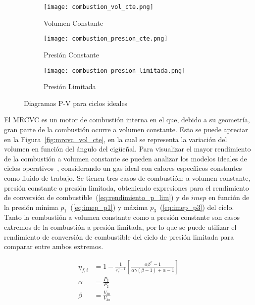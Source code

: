 \begin{figure}[ht]
  \centering
  \begin{subfigure}{0.3\textwidth}
    \centering
    \texttt{[image: combustion\_vol\_cte.png]}
    \caption{Volumen Constante}\label{fig:comb_vcte}
  \end{subfigure}%
  \begin{subfigure}{0.3\textwidth}
    \centering
    \texttt{[image: combustion\_presion\_cte.png]}
    \caption{Presión Constante}\label{fig:comb_pcte}
  \end{subfigure}%
  \begin{subfigure}{0.3\textwidth}
    \centering
    \texttt{[image: combustion\_presion\_limitada.png]}
    \caption{Presión Limitada}\label{fig:comb_plim}
  \end{subfigure}
  \caption{Diagramas P-V para ciclos ideales\parencite{heywood}}\label{fig:ciclos_ideales}
\end{figure}

El MRCVC es un motor de combustión interna en el que, debido a su geometría,
gran parte de la combustión ocurre a volumen constante.
%
Esto se puede apreciar en la Figura~\ref{fig:mrcvc_vol_cte}, en la cual se
representa la variación del volumen en función del ángulo del cigüeñal.
%
Para visualizar el mayor rendimiento de la combustión a volumen constante  se
pueden analizar los modelos ideales de ciclos operativos~\parencite{heywood},
considerando un gas ideal con calores específicos constantes como fluido de
trabajo.
%
Se tienen tres casos de combustión: a volumen constante, presión constante o presión
limitada, obteniendo expresiones para el rendimiento de conversión de
combustible~(\ref{eq:rendimiento_p_lim}) y de $imep$ en función de la presión
mínima $p_1$~(\ref{eq:imep_p1}) y máxima $p_3$~(\ref{eq:imep_p3}) del ciclo.
%
Tanto la combustión a volumen constante como a presión constante son casos
extremos de la combustión a presión limitada, por lo que se puede utilizar el
rendimiento de conversión de combustible del ciclo de presión limitada para
comparar entre ambos extremos.


\begin{align}
    \label{eq:rendimiento_p_lim}
  \eta_{f,i} &= 1 - \frac{1}{r_c^{\gamma - 1}} \left[ \frac{\alpha \beta^\gamma-1}{\alpha \gamma (\beta-1)+\alpha-1} \right]\\
  \alpha &= \frac{P_3}{P_2}\\ \beta &= \frac{V_{3b}}{V_{3a}}
\end{align}


